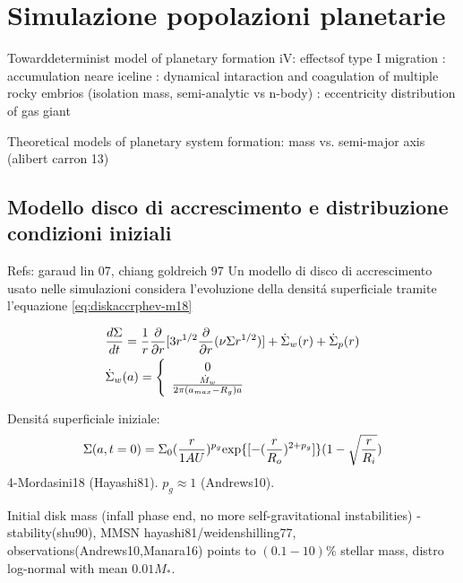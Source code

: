 {\let\clearpage\relax\let\cleardoublepage\relax
\chapter{Simulazione popolazioni planetarie}
}

\begin{workout}
Towarddeterminist model of planetary formation iV: effectsof type I migration
									: accumulation neare iceline
									: dynamical intaraction and coagulation of multiple rocky embrios (isolation mass, semi-analytic vs n-body)
									: eccentricity distribution of gas giant
									
Theoretical models of planetary system formation: mass vs. semi-major axis	(alibert carron 13)								
\end{workout}

\section{Modello disco di accrescimento e distribuzione condizioni iniziali}

\begin{workout}
Refs: garaud lin 07, chiang goldreich 97
Un modello di disco  di accrescimento usato nelle simulazioni considera l'evoluzione della densit\'a superficiale tramite l'equazione \eqref{eq:diskaccrphev-m18}

\begin{align}
&\frac{d \Sigma}{d t}=\frac{1}{r}\frac{\partial}{\partial r}[3r^{1/2}\frac{\partial}{\partial r}(\nu\Sigma r^{1/2})]+\dot{\Sigma}_w(r)+\dot{\Sigma}_p(r)\label{eq:diskaccrphev-m18}\\
&\dot{\Sigma}_w(a)=\left\{\begin{array}{c}0\\\frac{\dot{M}_w}{2\pi(a_{max}-R_g)a}\\\end{array}\right.
\end{align}

Densit\'a superficiale iniziale:
\begin{equation}
\Sigma(a,t=0)=\Sigma_0(\frac{r}{1AU})^{p_g}\text{exp}\{[-(\frac{r}{R_o})^{2+p_g}]\}(1-\sqrt{\frac{r}{R_i}})
\end{equation}
4-Mordasini18 (Hayashi81). $p_g\approx1$ (Andrews10).
\end{workout}

Initial disk mass
(infall phase end, no more self-gravitational instabilities) - stability(shu90), MMSN hayashi81/weidenshilling77, observations(Andrews10,Manara16) points to $(0.1-10)\%$ stellar mass, distro log-normal with mean $0.01M_*$.

